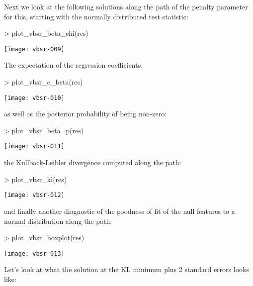 \documentclass[a4paper]{article}
\begin{document}
Next we look at the following solutions along the path of the penalty parameter for this, starting with the normally distributed test statistic:
\begin{center}
\begin{Schunk}
\begin{Sinput}
> plot_vbsr_beta_chi(res)
\end{Sinput}
\end{Schunk}
\texttt{[image: vbsr-009]}
\end{center}
The expectation of the regression coefficients:
\begin{center}
\begin{Schunk}
\begin{Sinput}
> plot_vbsr_e_beta(res)
\end{Sinput}
\end{Schunk}
\texttt{[image: vbsr-010]}
\end{center}
as well as the posterior probability of being non-zero:
\begin{center}
\begin{Schunk}
\begin{Sinput}
> plot_vbsr_beta_p(res)
\end{Sinput}
\end{Schunk}
\texttt{[image: vbsr-011]}
\end{center}
the Kullback-Leibler divergence computed along the path:
\begin{center}
\begin{Schunk}
\begin{Sinput}
> plot_vbsr_kl(res)
\end{Sinput}
\end{Schunk}
\texttt{[image: vbsr-012]}
\end{center}
and finally another diagnostic of the goodness of fit of the null features to a normal distribution along the path:
\begin{center}
\begin{Schunk}
\begin{Sinput}
> plot_vbsr_boxplot(res)
\end{Sinput}
\end{Schunk}
\texttt{[image: vbsr-013]}
\end{center}
Let's look at what the solution at the KL minimum plus 2 standard errors looks like:
\end{document}
